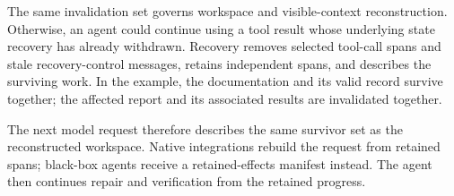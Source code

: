 The same invalidation set governs workspace and visible-context
reconstruction.
Otherwise, an agent could continue using a tool result whose underlying
state recovery has already withdrawn.
Recovery removes selected tool-call spans and stale recovery-control
messages, retains independent spans, and describes the surviving work.
In the example, the documentation and its valid record survive together;
the affected report and its associated results are invalidated together.

The next model request therefore describes the same survivor set as the
reconstructed workspace.
Native integrations rebuild the request from retained spans; black-box
agents receive a retained-effects manifest instead.
The agent then continues repair and verification from the retained
progress.
